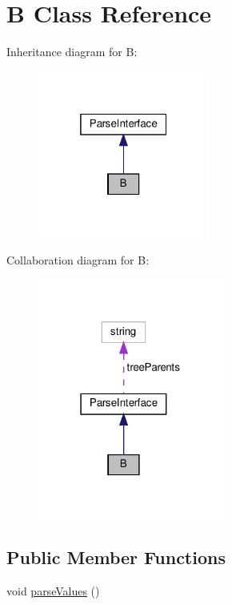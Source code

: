 \hypertarget{classB}{}\section{B Class Reference}
\label{classB}


Inheritance diagram for B\+:
\nopagebreak
\begin{figure}[H]
\begin{center}
\leavevmode
\includegraphics[width=160pt]{classB__inherit__graph}
\end{center}
\end{figure}


Collaboration diagram for B\+:
\nopagebreak
\begin{figure}[H]
\begin{center}
\leavevmode
\includegraphics[width=174pt]{classB__coll__graph}
\end{center}
\end{figure}
\subsection*{Public Member Functions}
\begin{DoxyCompactItemize}
\item 
void \hyperlink{classB_abf3989a414e46fb5dd4bd15a279008ab}{parse\+Values} ()
\end{DoxyCompactItemize}
